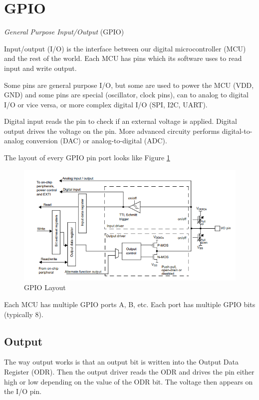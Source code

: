 \section{GPIO}
\emph{General Purpose Input/Output} (GPIO)

Input/output (I/O) is the interface between our digital microcontroller (MCU) and the rest of the world.
Each MCU has pins which its software uses to read input and write output.

Some pins are general purpose I/O, but some are used to power the MCU (VDD, GND) and some pins are
special (oscillator, clock pins), can to analog to digital I/O or vice versa, or more complex digital I/O (SPI, I2C, UART).

Digital input reads the pin to check if an external voltage is applied. Digital output drives the voltage on the pin. More advanced circuity performs
digital-to-analog conversion (DAC) or analog-to-digital (ADC).

The layout of every GPIO pin port looks like Figure \ref{fig:gpio}

\begin{figure}
    \includegraphics{images/gpio.png}
    \caption{GPIO Layout}
    \label{fig:gpio}
\end{figure}

Each MCU has multiple GPIO ports A, B, etc. Each port has multiple
GPIO bits (typically 8).

\subsection{Output}

The way output works is that an output bit is written
into the Output Data Register (ODR). Then the output driver
reads the ODR and drives the pin either high or low depending on
the value of the ODR bit. The voltage then appears on the I/O pin.

